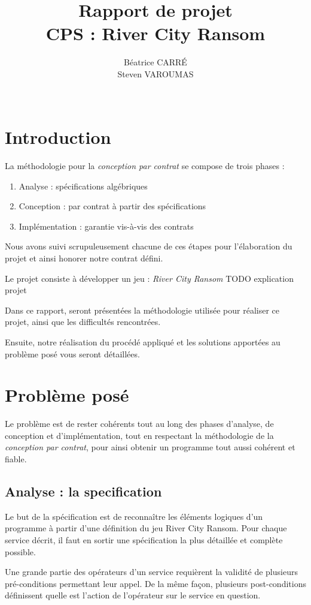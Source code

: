 \documentclass[a4paper, 11pt, notitlepage]{article}
\title{
  \huge Rapport de projet \\
  \huge CPS : River City Ransom\\
}
\author{
  Béatrice CARR\'E \\
  Steven VAROUMAS \\
  \\
}
\begin{document}
\maketitle
\section*{Introduction}
La méthodologie pour la \emph{conception par contrat}  se compose de trois phases :
\begin{enumerate}
\item Analyse : spécifications algébriques 
\item Conception : par contrat à partir des spécifications
\item Implémentation : garantie vis-à-vis des contrats
\end{enumerate}
Nous avons suivi scrupuleusement chacune de ces étapes pour l'élaboration du
projet et ainsi honorer notre contrat défini. 

Le projet consiste à développer un jeu : \emph{River City Ransom}
TODO explication projet

Dans ce rapport, seront présentées la méthodologie utilisée pour
réaliser ce projet, ainsi que les difficultés rencontrées.
 
Ensuite, notre réalisation du procédé appliqué
et les solutions apportées au problème posé vous seront détaillées.







\section{Problème posé}
Le problème est de rester cohérents tout au long des phases d'analyse,
de conception et d'implémentation, tout en respectant la méthodologie de la \emph{conception par contrat},
pour ainsi obtenir un programme tout aussi cohérent et fiable.

\subsection{Analyse : la specification}
Le but de la spécification est de reconnaître les éléments logiques
d’un programme à partir d’une définition du jeu River City Ransom.
Pour chaque service décrit, il faut en sortir une spécification la
plus détaillée et complète possible.

Une grande partie des opérateurs d'un service requièrent la validité de plusieurs pré-conditions permettant leur appel. De la même façon, plusieurs post-conditions définissent quelle est l'action de l'opérateur sur le service en question.
\end{document}
